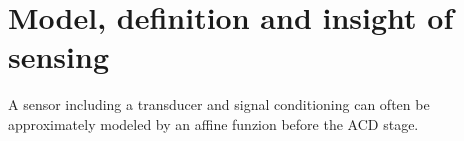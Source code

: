 \section{Model, definition and insight of sensing}
A sensor including a transducer and signal conditioning can often be
approximately modeled by an affine funzion before the ACD stage.

